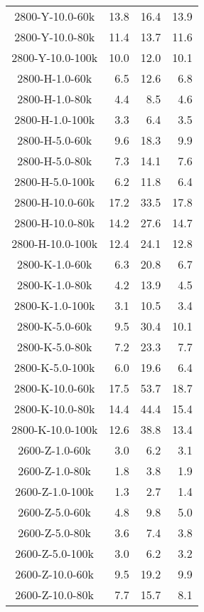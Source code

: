 \begin{longtable}{crrr}
    2800-Y-10.0-60k  &   13.8 &   16.4 &   13.9 \\
    2800-Y-10.0-80k  &   11.4 &   13.7 &   11.6 \\
    2800-Y-10.0-100k &   10.0 &   12.0 &   10.1 \\
    2800-H-1.0-60k   &    6.5 &   12.6 &    6.8 \\
    2800-H-1.0-80k   &    4.4 &    8.5 &    4.6 \\
    2800-H-1.0-100k  &    3.3 &    6.4 &    3.5 \\
    2800-H-5.0-60k   &    9.6 &   18.3 &    9.9 \\
    2800-H-5.0-80k   &    7.3 &   14.1 &    7.6 \\
    2800-H-5.0-100k  &    6.2 &   11.8 &    6.4 \\
    2800-H-10.0-60k  &   17.2 &   33.5 &   17.8 \\
    2800-H-10.0-80k  &   14.2 &   27.6 &   14.7 \\
    2800-H-10.0-100k &   12.4 &   24.1 &   12.8 \\
    2800-K-1.0-60k   &    6.3 &   20.8 &    6.7 \\
    2800-K-1.0-80k   &    4.2 &   13.9 &    4.5 \\
    2800-K-1.0-100k  &    3.1 &   10.5 &    3.4 \\
    2800-K-5.0-60k   &    9.5 &   30.4 &   10.1 \\
    2800-K-5.0-80k   &    7.2 &   23.3 &    7.7 \\
    2800-K-5.0-100k  &    6.0 &   19.6 &    6.4 \\
    2800-K-10.0-60k  &   17.5 &   53.7 &   18.7 \\
    2800-K-10.0-80k  &   14.4 &   44.4 &   15.4 \\
    2800-K-10.0-100k &   12.6 &   38.8 &   13.4 \\
    2600-Z-1.0-60k   &    3.0 &    6.2 &    3.1 \\
    2600-Z-1.0-80k   &    1.8 &    3.8 &    1.9 \\
    2600-Z-1.0-100k  &    1.3 &    2.7 &    1.4 \\
    2600-Z-5.0-60k   &    4.8 &    9.8 &    5.0 \\
    2600-Z-5.0-80k   &    3.6 &    7.4 &    3.8 \\
    2600-Z-5.0-100k  &    3.0 &    6.2 &    3.2 \\
    2600-Z-10.0-60k  &    9.5 &   19.2 &    9.9 \\
    2600-Z-10.0-80k  &    7.7 &   15.7 &    8.1 \\

\end{longtable}
